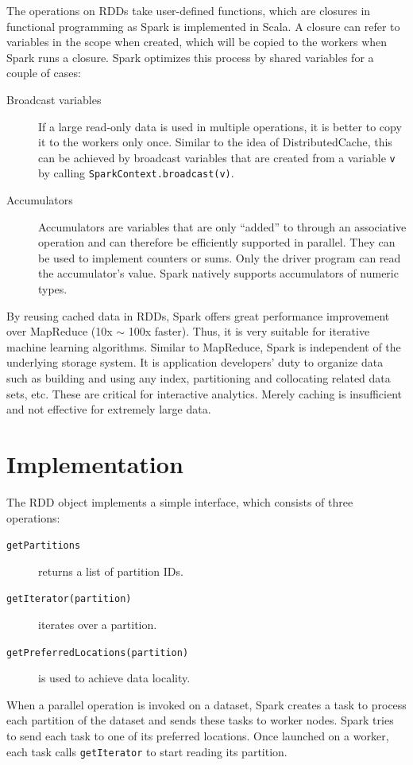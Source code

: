\documentclass[12pt]{book}
\begin{document}
The operations on RDDs take user-defined functions, which are closures in functional programming as Spark is implemented in Scala. A closure can refer to variables in the scope when created, which will be copied to the workers when Spark runs a closure. Spark optimizes this process by shared variables for a couple of cases:
\begin{description}
\item[Broadcast variables]
If a large read-only data is used in multiple operations, it is better to copy it to the workers only once. Similar to the idea of DistributedCache, this can be achieved by broadcast variables that are created from a variable \texttt{v} by calling \texttt{SparkContext.broadcast(v)}.
\item[Accumulators]
Accumulators are variables that are only ``added'' to through an associative operation and can therefore be efficiently supported in parallel. They can be used to implement counters or sums. Only the driver program can read the accumulator's value. Spark natively supports accumulators of numeric types.
\end{description}
By reusing cached data in RDDs, Spark offers great performance improvement over MapReduce (10x $\sim$ 100x faster). Thus, it is very suitable for iterative machine learning algorithms.
Similar to MapReduce, Spark is independent of the underlying storage system. It is application developers' duty to organize data such as building and using any index, partitioning and collocating related data sets, etc. These are critical for interactive analytics. Merely caching is insufficient and not effective for extremely large data.

\section{Implementation}
The RDD object implements a simple interface, which consists of three operations:
\begin{description}
\item[\texttt{getPartitions}] returns a list of partition IDs.
\item[\texttt{getIterator(partition)}] iterates over a partition.
\item[\texttt{getPreferredLocations(partition)}] is used to achieve data locality.
\end{description}
When a parallel operation is invoked on a dataset, Spark creates a task to process each partition of the dataset and sends these tasks to worker nodes. Spark tries to send each task to one of its preferred locations. Once launched on a worker, each task calls \texttt{getIterator} to start reading its partition.
\end{document}
